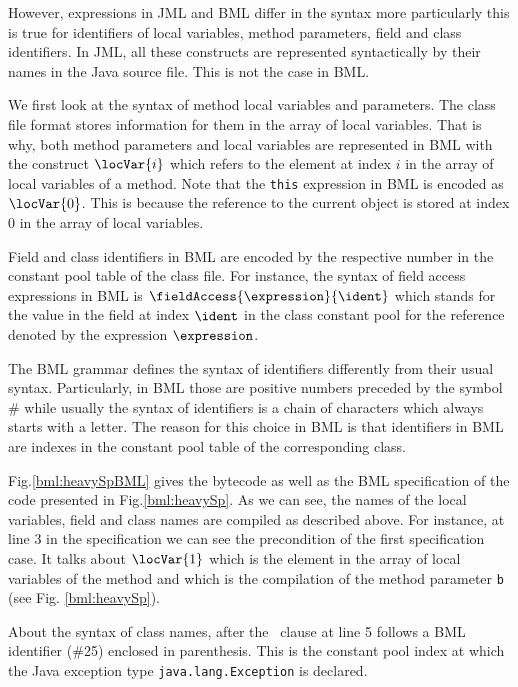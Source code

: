However, expressions in JML and BML differ in the syntax more particularly this is true for identifiers 
of local variables, method parameters, field and class identifiers. In JML, all these constructs
 are represented syntactically by their names in the Java source file. This is not the case in BML.

 We first look at the syntax of method local variables and parameters.
 The class file format stores information for them in the array of local variables.
 That is why, both method parameters and local variables are represented in BML 
 with the construct  $\locVar{i}$ which refers to the element at index $i$ in the array of local
 variables of a method. Note that the \texttt{this} expression in BML is encoded
 as $\locVar{0}$. This is because the reference to the current object is stored at index 0 in the array of local variables.

 
 Field and class identifiers in BML are encoded by the respective number in the constant pool table of the class file.
 For instance, the syntax of field access expressions  in BML is $\fieldAccess{\expression}{\ident}$ which 
 stands for the value in the field at index $\ident$ in the class constant pool 
 for the reference denoted by the expression  $ \expression $. 

 The BML grammar defines the syntax of identifiers differently from their usual syntax.
 Particularly, in BML those are positive numbers preceded by the symbol \# while usually
 the syntax of identifiers is a chain of characters which always starts with a letter. 
 The reason for this choice in BML  is that identifiers in BML are indexes in the constant
 pool table of the corresponding class.     

 Fig.\ref{bml:heavySpBML} gives the bytecode as well as the BML specification
 of the code presented in   Fig.\ref{bml:heavySp}. As we can see, the names of the local variables, field and class names  
 are compiled as described above.
 For instance, at line 3 in the specification we can see the precondition of the first specification case.
 It talks about $\locVar{1}$ which is the element in the array of local variables
 of the method  and which is the compilation of  the method parameter \texttt{b} (see Fig. \ref{bml:heavySp}). 

About the syntax of class names,  after the
 \exsures \ clause at line 5 follows a BML identifier (\#25) enclosed in parenthesis.
 This is the constant pool index at which the Java exception  type \texttt{java.lang.Exception} is declared.
 
